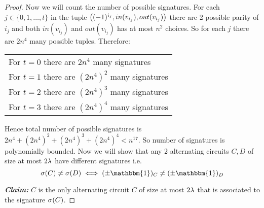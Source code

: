 \begin{proof}
	Now we will count the number of possible signatures. For each $j\in \{0,1,\dots,t\}$ in the tuple $\left( (-1)^{i_j},in(v_{i_j}), out(v_{i_j}) \right)$ there are 2 possible parity of $i_j$ and both $in(v_{i_j})$ and $out(v_{i_j})$ has at most $n^2$ choices. So for each $j$ there are $2n^4$ many possible tuples. Therefore:
	\begin{center}
		\begin{tabular}{l}
			For  $t=0$ there are  $2n^4$ many signatures     \\
			For  $t=1$ there are  $(2n^4)^2$ many signatures \\
			For  $t=2$ there are  $(2n^4)^3$ many signatures \\
			For  $t=3$ there are  $(2n^4)^4$ many signatures
		\end{tabular}
	\end{center}
	Hence total number of possible signatures is $2n^4+(2n^4)^2+(2n^4)^3+(2n^4)^4<n^{17}$. So number of signatures is polynomially bounded. Now we will show that any 2 alternating circuits $C,D$ of size at most $2\lambda$ have different signatures i.e.$$\sg(C)\neq \sg(D)\iff (\pm\mathbbm{1})_C\neq (\pm\mathbbm{1})_D$$\parinf \vspace*{2mm}

	\textbf{\textit{Claim:} } $C$ is the only alternating circuit $C$ of size at most $2\lambda$ that is associated to the signature $\sigma(C)$.


\end{proof}
